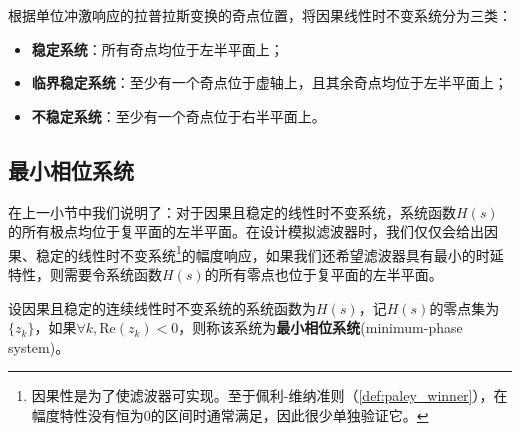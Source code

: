 \begin{definition}
    根据单位冲激响应的拉普拉斯变换的奇点位置，将因果线性时不变系统分为三类：
    \begin{itemize}
        \item \textbf{稳定系统}：所有奇点均位于左半平面上；
        \item \textbf{临界稳定系统}：至少有一个奇点位于虚轴上，且其余奇点均位于左半平面上；
        \item \textbf{不稳定系统}：至少有一个奇点位于右半平面上。
    \end{itemize}
\end{definition}


\subsection{最小相位系统}\label{sub:min_phase}

在上一小节中我们说明了：对于因果且稳定的线性时不变系统，系统函数$H(s)$的所有极点均位于复平面的左半平面。在设计模拟滤波器时，我们仅仅会给出因果、稳定的线性时不变系统\footnote{因果性是为了使滤波器可实现。至于佩利-维纳准则（\cref{def:paley_winner}），在幅度特性没有恒为0的区间时通常满足，因此很少单独验证它。}的幅度响应，如果我们还希望滤波器具有最小的时延特性，则需要令系统函数$H(s)$的所有零点也位于复平面的左半平面。

\begin{definition}[最小相位系统]
    设因果且稳定的连续线性时不变系统的系统函数为$H(s)$，记$H(s)$的零点集为$\{z_k\}$，如果$\forall k,\mathrm{Re}(z_k)<0$，则称该系统为\textbf{最小相位系统}(minimum-phase system)。
\end{definition}

